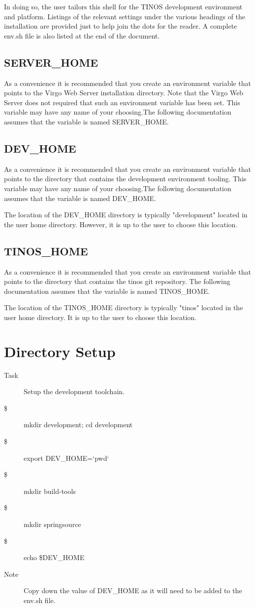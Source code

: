 In doing so, the user tailors this shell for the TINOS development environment
and platform. Listings of the relevant settings under the various headings of the
installation are provided just to help join the dots for the reader. A complete env.sh
file is also listed at the end of the document.

\subsection{SERVER\_HOME}
As a convenience it is recommended that you create an environment variable that points
to the Virgo Web Server installation directory. Note that the Virgo Web Server does not
required that such an environment variable has been set. This variable may have any
name of your choosing.The following documentation assumes that the variable is
named SERVER\_HOME.

\subsection{DEV\_HOME}
As a convenience it is recommended that you create an environment variable that points
to the directory that contains the development environment tooling. This variable may
have any name of your choosing.The following documentation assumes that the variable
is named DEV\_HOME.

The location of the DEV\_HOME directory is typically "development" located in the user
home directory. However, it is up to the user to choose this location.

\subsection{TINOS\_HOME}
As a convenience it is recommended that you create an environment variable that points
to the directory that contains the tinos git repository. The following documentation assumes
that the variable is named TINOS\_HOME.

The location of the TINOS\_HOME directory is typically "tinos" located in the user home
directory. It is up to the user to choose this location.

\section{Directory Setup}
\begin{description}
 \item[Task] Setup the development toolchain.
 \item[\$] mkdir development; cd development
 \item[\$] export DEV\_HOME=`pwd`
 \item[\$] mkdir build-tools
 \item[\$] mkdir springsource
 \item[\$] echo \$DEV\_HOME
 \item[Note] Copy down the value of DEV\_HOME as it will need to be added to the
 env.sh file.
\end{description}

